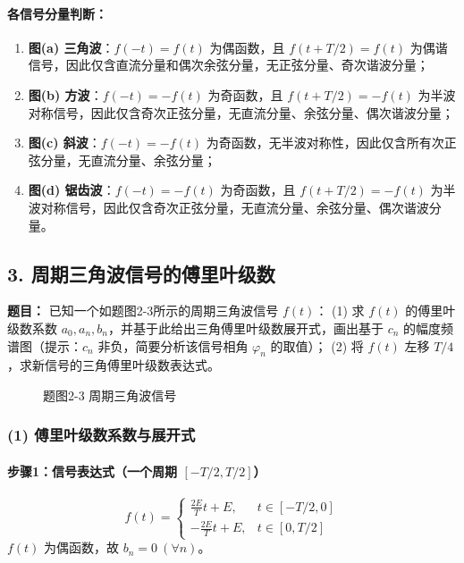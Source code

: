\paragraph{各信号分量判断：}
\begin{enumerate}
    \item \textbf{图(a) 三角波}：$f(-t)=f(t)$ 为偶函数，且 $f(t+T/2)=f(t)$ 为偶谐信号，因此仅含直流分量和偶次余弦分量，无正弦分量、奇次谐波分量；
    \item \textbf{图(b) 方波}：$f(-t)=-f(t)$ 为奇函数，且 $f(t+T/2)=-f(t)$ 为半波对称信号，因此仅含奇次正弦分量，无直流分量、余弦分量、偶次谐波分量；
    \item \textbf{图(c) 斜波}：$f(-t)=-f(t)$ 为奇函数，无半波对称性，因此仅含所有次正弦分量，无直流分量、余弦分量；
    \item \textbf{图(d) 锯齿波}：$f(-t)=-f(t)$ 为奇函数，且 $f(t+T/2)=-f(t)$ 为半波对称信号，因此仅含奇次正弦分量，无直流分量、余弦分量、偶次谐波分量。
\end{enumerate}

\subsection{3. 周期三角波信号的傅里叶级数}
\textbf{题目：} 已知一个如题图2-3所示的周期三角波信号 \( f(t) \)：
(1) 求 \( f(t) \) 的傅里叶级数系数 \( a_0, a_n, b_n \)，并基于此给出三角傅里叶级数展开式，画出基于 \( c_n \) 的幅度频谱图（提示：$c_n$ 非负，简要分析该信号相角 \( \varphi_n \) 的取值）；
(2) 将 \( f(t) \) 左移 \( T/4 \)，求新信号的三角傅里叶级数表达式。

\begin{figure}[htbp]
\centering
{}
\caption{题图2-3 周期三角波信号}
\end{figure}

\subsubsection{(1) 傅里叶级数系数与展开式}
\paragraph{步骤1：信号表达式（一个周期 \( [-T/2,T/2] \)）}
\[
f(t) =
\begin{cases}
\frac{2E}{T}t + E, & t\in[-T/2,0] \\
-\frac{2E}{T}t + E, & t\in[0,T/2]
\end{cases}
\]
\( f(t) \) 为偶函数，故 \( b_n=0 \ (\forall n) \)。

